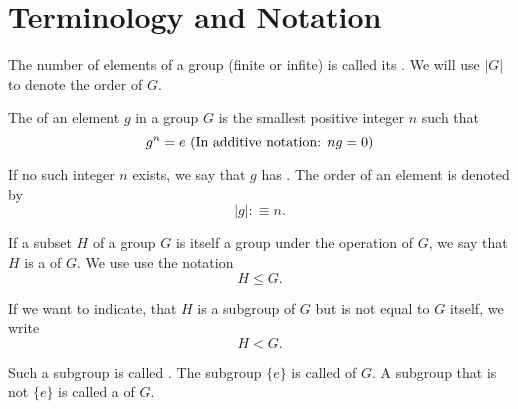 \section{Terminology and Notation}

\begin{mydef}
  The number of elements of a group (finite or infite) is called its . We will use $|G|$ to denote the order of $G$.
\end{mydef}

\begin{mydef}
  The  of an element $g$ in a group $G$ is the smallest positive integer $n$ such that
  \begin{equation}
    g^n = e $ (In additive notation: $ng = 0$)$
  \end{equation}

  If no such integer $n$ exists, we say that $g$ has . The order of an element is denoted by
  \begin{equation}
    \left | g \right | :\equiv n.
  \end{equation}

\end{mydef}

\begin{mydef}[Subgroup]
  If a subset $H$ of a group $G$ is itself a group under the operation of $G$, we say that $H$ is a  of $G$. We use use the notation
  \begin{equation}
    H \leq G.
  \end{equation}

  If we want to indicate, that $H$ is a subgroup of $G$ but is not equal to $G$ itself, we write
  \begin{equation}
    H < G.
  \end{equation}

  Such a subgroup is called . The subgroup $\{e\}$ is called  of $G$. A subgroup that is not $\{e\}$ is called a  of $G$.

\end{mydef}

